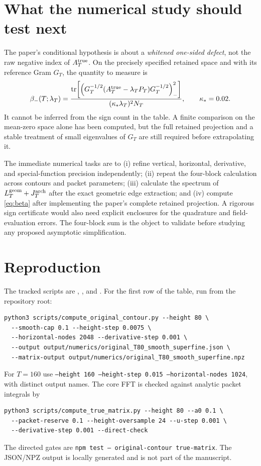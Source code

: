 \documentclass[11pt]{article}
\begin{document}
\section{What the numerical study should test next}

The paper's conditional hypothesis is about a \emph{whitened one-sided defect},
not the raw negative index of $A_T^{\rm true}$. On the precisely specified
retained space and with its reference Gram $G_T$, the quantity to measure is
\begin{equation}
\beta_-(T;\lambda_T)=
\frac{\operatorname{tr}\!\left[
\left(G_T^{-1/2}(A_T^{\rm true}-\lambda_TP_T)G_T^{-1/2}\right)_-^2
\right]}{(\kappa_*\lambda_T)^2N_T},
\qquad\kappa_*=0.02.
\label{eq:beta}
\end{equation}
It cannot be inferred from the sign count in the table. A finite comparison
on the mean-zero space alone has been computed, but the full retained
projection and a stable treatment of small eigenvalues of $G_T$ are still
required before extrapolating it.

The immediate numerical tasks are to (i) refine vertical, horizontal,
derivative, and special-function precision independently; (ii) repeat the
four-block calculation across contours and packet parameters; (iii) calculate
the spectrum of $L_T^{\rm geom}+J_T^{\rm arch}$ after the exact geometric edge
extraction; and (iv) compute \eqref{eq:beta} after implementing the paper's
complete retained projection. A rigorous sign certificate would also need
explicit enclosures for the quadrature and field-evaluation errors. The
four-block sum is the object to validate before studying any proposed
asymptotic simplification.

\section*{Reproduction}

The tracked scripts are ,
, and
. For the first row of the
table, run from the repository root:
\begin{verbatim}
python3 scripts/compute_original_contour.py --height 80 \
  --smooth-cap 0.1 --height-step 0.0075 \
  --horizontal-nodes 2048 --derivative-step 0.001 \
  --output output/numerics/original_T80_smooth_superfine.json \
  --matrix-output output/numerics/original_T80_smooth_superfine.npz
\end{verbatim}
For $T=160$ use \texttt{--height 160 --height-step 0.015
--horizontal-nodes 1024}, with distinct output names. The core FFT is checked
against analytic packet integrals by
\begin{verbatim}
python3 scripts/compute_true_matrix.py --height 80 --a0 0.1 \
  --packet-reserve 0.1 --height-oversample 24 --u-step 0.001 \
  --derivative-step 0.001 --direct-check
\end{verbatim}
The directed gates are \texttt{npm test -- original-contour true-matrix}.
The JSON/NPZ output is locally generated and is not part of the manuscript.
\end{document}
